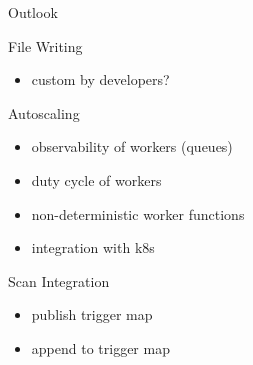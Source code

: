 \documentclass[aspectratio=169]{beamer}
\begin{document}
\begin{frame}{Outlook}
 \begin{block}{File Writing}
  \begin{itemize}
   \item custom by developers?
  \end{itemize}

 \end{block}
 
 \begin{block}{Autoscaling}
  \begin{itemize}
   \item observability of workers (queues)
   \item duty cycle of workers
   \item non-deterministic worker functions
   \item integration with k8s
  \end{itemize}

 \end{block}


 \begin{block}{Scan Integration}
  \begin{itemize}
   \item publish trigger map
   \item append to trigger map
  \end{itemize}

 \end{block}

\end{frame}
\end{document}
